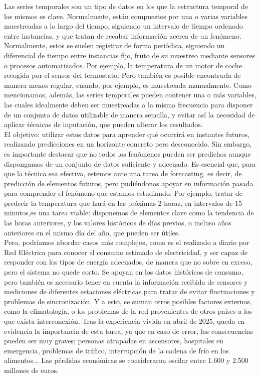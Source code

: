 Las series temporales son un tipo de datos en los que la estructura temporal de los mismos es clave. Normalmente, están compuestos por una o varias variables muestreadas a lo largo del tiempo, siguiendo un intervalo de tiempo ordenado entre instancias, y que tratan de recabar información acerca de un fenómeno. Normalmente, estos se suelen registrar de forma periódica, siguiendo un diferencial de tiempo entre instancias fijo, fruto de su muestreo mediante sensores o procesos automatizados. Por ejemplo, la temperatura de un motor de coche recogida por el sensor del termostato. Pero también es posible encontrarla de manera menos regular, cuando, por ejemplo, es muestreada manualmente. Como mencionamos, además, las series temporales pueden contener una o más variables, las cuales idealmente deben ser muestreadas a la misma frecuencia para disponer de un conjunto de datos utilizable de manera sencilla, y evitar así la necesidad de aplicar técnicas de inputación, que pueden alterar los resultados.\\

El objetivo: utilizar estos datos para aprender qué ocurrirá en instantes futuros, realizando predicciones en un horizonte concreto pero desconocido. Sin embargo, es importante destacar que no todos los fenómenos pueden ser predichos aunque dispongamos de un conjunto de datos suficiente y adecuado. Es esencial que, para que la técnica sea efectiva, estemos ante una tarea de forecasting, es decir, de predicción de elementos futuros, pero pudiéndonos apoyar en información pasada para comprender el fenómeno que estamos estudiando. Por ejemplo, tratar de predecir la temperatura que hará en las próximas 2 horas, en intervalos de 15 minutos,es una tarea viable: disponemos de elementos clave como la tendencia de las horas anteriores, y los valores históricos de días previos, o incluso años anteriores en el mismo día del año, que pueden ser útiles.\\

Pero, podríamos abordar casos más complejos, como es el realizado a diario por Red Eléctrica para conocer el consumo estimado de electricidad, y ser capaz de responder con los tipos de energía adecuados, de manera que no sobre en exceso, pero el sistema no quede corto. Se apoyan en los datos históricos de consumo, pero también es necesario tener en cuenta la información recibida de sensores y mediciones de diferentes estaciones eléctricas para tratar de evitar fluctuaciones y problemas de sincronización. Y a esto, se suman otros posibles factores externos, como la climatología, o los problemas de la red provenientes de otros países a los que exista interconexión.
Tras la experiencia vivida en abril de 2025, queda en evidencia la importancia de esta tarea, ya que en caso de error, las consecuencias pueden ser muy graves: personas atrapadas en ascensores, hospitales en emergencia, problemas de tráfico, interrupción de la cadena de frío en los alimentos...
Las pérdidas económicas se consideraron oscilar entre 1.600 y 2.500 millones de euros.

